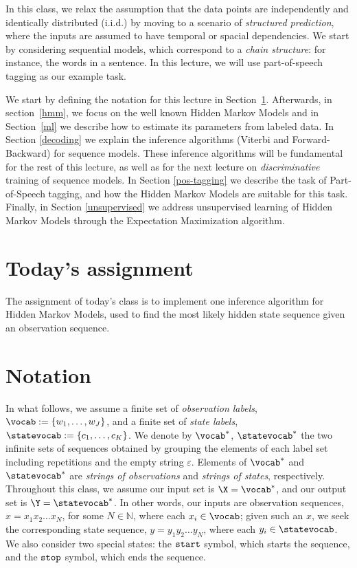 

In this class, we relax the assumption that
the data points are independently and identically distributed (i.i.d.) 
by moving to a scenario of \emph{structured prediction}, where the inputs are assumed to have
temporal or spacial dependencies. We start by 
considering sequential models, which correspond to a \emph{chain structure}: for instance,
the words in a sentence. In this lecture, we will use part-of-speech
tagging as our example task.  

We start by defining the notation for this lecture in Section~\ref{notation}.
Afterwards, in section~\ref{hmm}, we focus on the well known Hidden Markov Models and in Section~\ref{ml} we describe how to estimate its parameters from labeled data. In Section \ref{decoding} we explain the inference
algorithms (Viterbi and Forward-Backward) for sequence models. These
inference algorithms will be fundamental for the rest of this lecture,
as well as for the next lecture on \emph{discriminative} training of sequence
models. In Section \ref{pos-tagging} we describe the task of 
Part-of-Speech tagging, and how the Hidden Markov Models are suitable for this task. 
Finally, in Section \ref{unsupervised} we 
address unsupervised learning of Hidden Markov Models through the Expectation Maximization
algorithm.

\section*{Today's assignment}

The assignment of today's class is to implement one inference algorithm for Hidden Markov Models, used to find the most likely hidden state sequence given an observation sequence.

\section{Notation}\label{notation}

In what follows, 
we assume a finite set of \emph{observation labels}, 
$\vocab := \{w_1,\ldots,w_J\}$,
and a finite set of \emph{state labels}, 
$\statevocab := \{c_1,\ldots, c_K\}$. We denote by $\vocab^*$, $\statevocab^*$ the two infinite sets of sequences obtained by grouping the elements of each label set including repetitions and the empty string $\varepsilon$\footnotemark{}. 
Elements of $\vocab^*$ and $\statevocab^*$ 
are \emph{strings of observations} and \emph{strings of states}, 
respectively. 
Throughout this class, we 
assume our input set is $\X = \vocab^*$, 
and our output set is $\Y = \statevocab^*$. 
In other words, 
our inputs are observation sequences, 
$x = x_1 x_2 \ldots x_N$, 
for some $N \in \mathbb{N}$, where each $x_i \in \vocab$;
given such an $x$, we seek 
the corresponding state sequence, 
$y = y_1 y_2 \ldots y_N$, 
where each $y_i \in \statevocab$. We also consider two special states: the ${\tt start}$ symbol,
which starts the sequence, and 
the ${\tt stop}$ symbol, which ends the sequence. 

